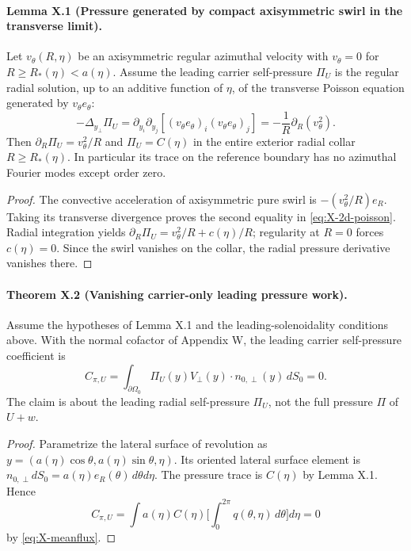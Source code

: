 \paragraph{Lemma X.1 (Pressure generated by compact axisymmetric swirl in the transverse limit).}
Let $v_\theta(R,\eta)$ be an axisymmetric regular azimuthal velocity with $v_\theta=0$ for $R\ge R_*(\eta)<a(\eta)$. Assume the leading carrier self-pressure $\Pi_U$ is the regular radial solution, up to an additive function of $\eta$, of the transverse Poisson equation generated by $v_\theta e_\theta$:
\begin{equation}\label{eq:X-2d-poisson}
 -\Delta_{y_\perp}\Pi_U
 =\partial_{y_i}\partial_{y_j}
 [(v_\theta e_\theta)_i(v_\theta e_\theta)_j]
 =-\frac1R\partial_R(v_\theta^2).
\end{equation}
Then $\partial_R\Pi_U=v_\theta^2/R$ and $\Pi_U=C(\eta)$ in the entire exterior radial collar $R\ge R_*(\eta)$. In particular its trace on the reference boundary has no azimuthal Fourier modes except order zero.
\begin{proof}
The convective acceleration of axisymmetric pure swirl is $-(v_\theta^2/R)e_R$. Taking its transverse divergence proves the second equality in \eqref{eq:X-2d-poisson}. Radial integration yields $\partial_R\Pi_U=v_\theta^2/R+c(\eta)/R$; regularity at $R=0$ forces $c(\eta)=0$. Since the swirl vanishes on the collar, the radial pressure derivative vanishes there.
\end{proof}

\paragraph{Theorem X.2 (Vanishing carrier-only leading pressure work).}
Assume the hypotheses of Lemma X.1 and the leading-solenoidality conditions above. With the normal cofactor of Appendix W, the leading carrier self-pressure coefficient is
\begin{equation}\label{eq:X-carrier-zero}
 \boxed{C_{\pi,U}=\int_{\partial\Omega_0}\Pi_U(y)V_\perp(y)\cdot n_{0,\perp}(y)\,dS_0=0.}
\end{equation}
The claim is about the leading radial self-pressure $\Pi_U$, not the full pressure $\Pi$ of $U+w$.
\begin{proof}
Parametrize the lateral surface of revolution as $y=(a(\eta)\cos\theta,a(\eta)\sin\theta,\eta)$. Its oriented lateral surface element is $n_{0,\perp}dS_0=a(\eta)e_R(\theta)\,d\theta d\eta$. The pressure trace is $C(\eta)$ by Lemma X.1. Hence
\[
 C_{\pi,U}=\int a(\eta)C(\eta)\bigg[\int_0^{2\pi}q(\theta,\eta)\,d\theta\bigg]d\eta=0
\]
by \eqref{eq:X-meanflux}.
\end{proof}

